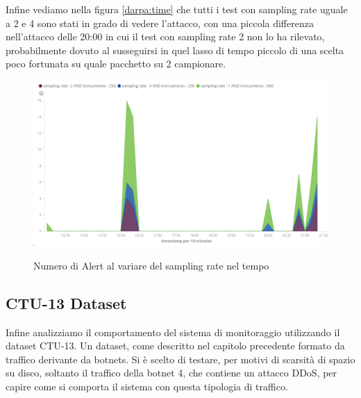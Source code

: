 \documentclass[12pt,a4paper,openright,twoside]{report}
\begin{document}
 Infine vediamo nella figura \ref{darpa:time} che tutti i test con sampling rate
 uguale a 2 e 4 sono stati in grado di vedere l'attacco, con una piccola differenza nell'attacco
 delle 20:00 in cui il test con sampling rate 2 non lo ha rilevato, probabilmente dovuto
 al susseguirsi in quel lasso di tempo piccolo di una scelta poco fortunata su quale pacchetto su
 2 campionare.


\begin{figure}[h!]
\begin{center}                          %
  \includegraphics[width=\textwidth]{images/DARPA-time.png}
  \caption{Numero di Alert al variare del sampling rate nel tempo}\label{darpa:time}
  \label{}
\end{center}
\end{figure}

\clearpage

\subsection{CTU-13 Dataset}

Infine analizziamo il comportamento del sistema di monitoraggio utilizzando il dataset
CTU-13. Un dataset, come descritto nel capitolo precedente formato da traffico derivante
da botnets. Si \`e scelto di testare, per motivi di scarsit\`a di spazio su disco, soltanto il traffico della
botnet 4, che contiene un attacco DDoS, per capire come si comporta il sistema con questa
tipologia di traffico.
\end{document}
